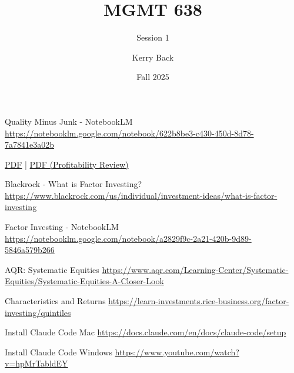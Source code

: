 \documentclass[aspectratio=169]{beamer}
\title{MGMT 638}
\subtitle{Session 1}
\author{Kerry Back}
\institute{}
\date{Fall 2025}
\begin{document}
\maketitle

\begin{frame}{Quality Minus Junk - NotebookLM}
\centering
\Large
\url{https://notebooklm.google.com/notebook/622b8be3-c430-450d-8d78-7a7841e3a02b}

\vspace{1em}

\href{https://mgmt638.kerryback.com/Asness_Frazzini_Pedersen_RAS_2019.pdf}{PDF} | \href{https://mgmt638.kerryback.com/Novy-Marx_Medhat_2025.pdf}{PDF (Profitability Review)}
\end{frame}

\begin{frame}{Blackrock - What is Factor Investing?}
\centering
\Large
\url{https://www.blackrock.com/us/individual/investment-ideas/what-is-factor-investing}
\end{frame}

\begin{frame}{Factor Investing - NotebookLM}
\centering
\Large
\url{https://notebooklm.google.com/notebook/a2829f9c-2a21-420b-9d89-5846a579b266}
\end{frame}

\begin{frame}{AQR: Systematic Equities}
\centering
\Large
\url{https://www.aqr.com/Learning-Center/Systematic-Equities/Systematic-Equities-A-Closer-Look}
\end{frame}

\begin{frame}{Characteristics and Returns}
\centering
\Large
\url{https://learn-investments.rice-business.org/factor-investing/quintiles}
\end{frame}

\begin{frame}{Install Claude Code Mac}
\centering
\Large
\url{https://docs.claude.com/en/docs/claude-code/setup}
\end{frame}

\begin{frame}{Install Claude Code Windows}
\centering
\Large
\url{https://www.youtube.com/watch?v=hpMrTabldEY}
\end{frame}
\end{document}
